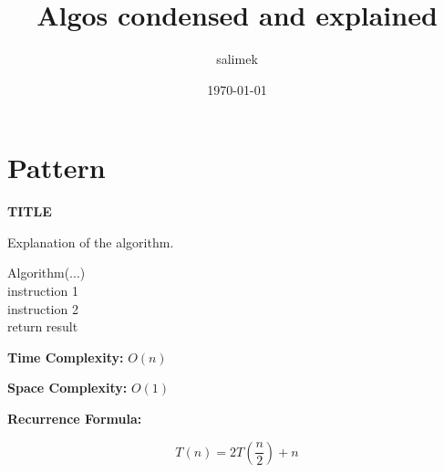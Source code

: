 \documentclass[a4paper,12pt]{article}
\title{Algos condensed and explained}
\author{salimek}
\date{\today}
\begin{document}
\maketitle



\section{Pattern}

\begin{tcolorbox}[
    colback=gray!30,
    colframe=black,
    boxrule=1pt,
    arc=0mm
]

\begin{tcolorbox}[
    colback=gray!10,
    colframe=black,
    arc=0mm
]
\centering
{\Huge\bfseries TITLE}
\end{tcolorbox}

\begin{tcolorbox}[
    colback=gray!10,
    colframe=black,
    arc=0mm
]
\small
Explanation of the algorithm.
\end{tcolorbox}

\begin{tcolorbox}[
    colback=black!5,
    colframe=black,
    arc=0mm,
    title=Pseudo-code
]
\small
\ttfamily
Algorithm(...)\\
\quad instruction 1\\
\quad instruction 2\\
\quad return result
\end{tcolorbox}

\begin{tcolorbox}[
    colback=cyan!20,
    colframe=black,
    arc=0mm
]
\small
\textbf{Time Complexity:} $O(n)$
\end{tcolorbox}

\begin{tcolorbox}[
    colback=violet!20,
    colframe=black,
    arc=0mm
]
\small
\textbf{Space Complexity:} $O(1)$
\end{tcolorbox}

\begin{tcolorbox}[
    colback=pink!20,
    colframe=black,
    arc=0mm
]
\small
\textbf{Recurrence Formula:}

\[
T(n)=2T\left(\frac{n}{2}\right)+n
\]
\end{tcolorbox}

\end{tcolorbox}
\end{document}
